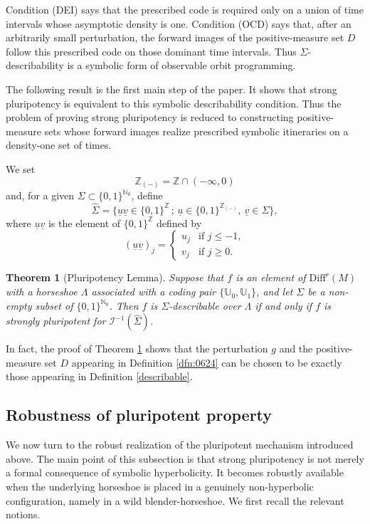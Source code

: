 \documentclass{amsart}
\newtheorem{mainresult}{Theorem}
\theoremstyle{definition}
\numberwithin{equation}{section}
\numberwithin{figure}{section}
\begin{document}
Condition (DEI) says that the prescribed code is required only on a union of time intervals whose asymptotic density is one. 
Condition (OCD) says that, after an arbitrarily small perturbation, the forward images of the positive-measure set $D$ follow this prescribed code on those dominant time intervals. 
Thus $\Sigma$-describability is a symbolic form of observable orbit programming.

The following result is the first main step of the paper. 
It shows that strong pluripotency is equivalent to this symbolic describability condition. 
Thus the problem of proving strong pluripotency is reduced to constructing positive-measure sets whose forward images realize prescribed symbolic itineraries on a density-one set of times.

We set
\[
\mathbb{Z}_{(-)}=\mathbb{Z}\cap(-\infty,0)
\]
and, for a given $\Sigma\subset \{0,1\}^{\mathbb N_0}$, define
\[
\widehat \Sigma
=
\bigl\{\underline u\underline v\in \{0,1\}^{\mathbb Z}\,;\,
\underline u\in \{0,1\}^{\mathbb Z_{(-)}},\ 
\underline v\in \Sigma
\bigr\},
\]
where $\underline u\underline v$ is the element of $\{0,1\}^{\mathbb Z}$ defined by
\[
(\underline u\underline v)_j=
\begin{cases}
u_j & \text{if } j\leq -1,\\
v_j & \text{if } j\geq 0.
\end{cases}
\]

\begin{mainresult}[Pluripotency Lemma]\label{p-lemma}
Suppose that $f$ is an element of $\mathrm{Diff}^r(M)$ with a horseshoe 
$\Lambda$ associated with a coding pair $\{\mathbb U_0,\mathbb U_1\}$, and let 
$\Sigma$ be a non-empty subset of $\{0,1\}^{\mathbb N_0}$.
Then $f$ is $\Sigma$-describable over $\Lambda$ if and only if 
$f$ is strongly pluripotent for $\mathcal I^{-1}(\widehat \Sigma)$.
\end{mainresult}

In fact, the proof of Theorem \ref{p-lemma} shows that the perturbation $g$ and the positive-measure set $D$ appearing in Definition \ref{dfn:0624} can be chosen to be exactly those appearing in Definition \ref{describable}.

\subsection{Robustness of pluripotent property}\label{ss_robust_pluri}

We now turn to the robust realization of the pluripotent mechanism introduced above. 
The main point of this subsection is that strong pluripotency is not merely a formal consequence of symbolic hyperbolicity. 
It becomes robustly available when the underlying horseshoe is placed in a genuinely non-hyperbolic configuration, namely in a wild blender-horseshoe. 
We first recall the relevant notions.
\end{document}
